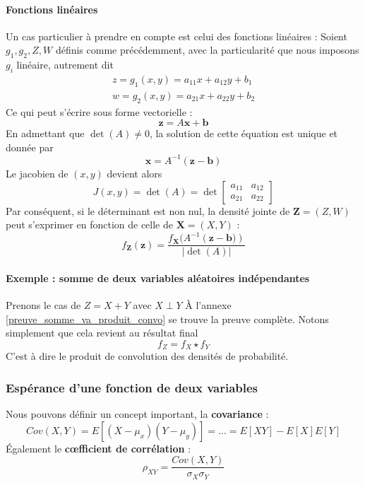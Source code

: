 \documentclass[11pt,a4paper]{article}
\numberwithin{equation}{section}
\begin{document}
\paragraph{Fonctions linéaires}
Un cas particulier à prendre en compte est celui des fonctions linéaires :
Soient $g_1,g_2,Z,W$ définis comme précédemment, avec la particularité que nous imposons $g_i$ linéaire, autrement dit 
\begin{align*}
    z = g_1(x,y) = a_{11}x + a_{12}y + b_1\\
    w = g_2(x,y) = a_{21}x + a_{22}y + b_2
\end{align*}
Ce qui peut s'écrire sous forme vectorielle :
\[\mathbf{z} = A\mathbf{x + b}\]
En admettant que $\det(A) \neq 0$, la solution de cette équation est unique et donnée par 
\[\mathbf{x} = A^{-1}(\mathbf{z-b})\]
Le jacobien de $(x,y)$ devient alors 
\[J(x,y) = \det(A) = \det\begin{bmatrix}
    a_{11} & a_{12}\\
    a_{21} & a_{22}
\end{bmatrix}\]
Par conséquent, si le déterminant est non nul, la densité jointe de $\mathbf{Z} = (Z,W)$ peut s'exprimer en fonction de celle de $\mathbf{X} = (X,Y)$ : 
\begin{equation}
    f_{\mathbf{Z}}(\mathbf{z}) = \frac{f_{\mathbf{X}}(A^{-1}(\mathbf{z-b)})}{|\det(A)|}
\end{equation}

\paragraph{Exemple : somme de deux variables aléatoires indépendantes}
Prenons le cas de $Z = X+ Y$ avec $X \perp Y$
À l'annexe \ref{preuve_somme_va_produit_convo} se trouve la preuve complète. Notons simplement que cela revient au résultat final 
\begin{equation}
    f_Z = f_X \star f_Y
\end{equation}
C'est à dire le produit de convolution des densités de probabilité.
\subsubsection{Espérance d'une fonction de deux variables}
Nous pouvons définir un concept important, la \textbf{covariance} :
\begin{equation}
Cov(X,Y) = E[(X-\mu_x)(Y-\mu_y)] = ... = E[XY] - E[X]E[Y]
\end{equation}
Également le \textbf{c\oe fficient de corrélation} :
\begin{equation}
	 \rho_{XY} = \frac{Cov(X,Y)}{\sigma_X \sigma_Y}
\end{equation}
\end{document}
